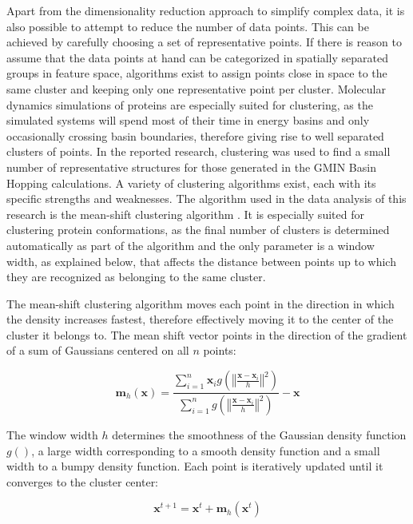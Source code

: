 \documentclass[english, a4paper, 12pt, titlepage, draft]{article}
\newcommand{\vect}[1]{\mathbf{#1}}
\newcommand{\norm}[1]{\left\Vert#1\right\Vert}
\newcommand{\fun}[2]{#1\left(#2\right)}
\begin{document}
Apart from the dimensionality reduction approach to simplify complex data, it is also possible to attempt to reduce the number of data points.
This can be achieved by carefully choosing a set of representative points.
If there is reason to assume that the data points at hand can be categorized in spatially separated groups in feature space, algorithms exist to assign points close in space to the same cluster and keeping only one representative point per cluster.
Molecular dynamics simulations of proteins are especially suited for clustering, as the simulated systems will spend most of their time in energy basins and only occasionally crossing basin boundaries, therefore giving rise to well separated clusters of points.
In the reported research, clustering was used to find a small number of representative structures for those generated in the GMIN Basin Hopping calculations.
A variety of clustering algorithms exist, each with its specific strengths and weaknesses.
The algorithm used in the data analysis of this research is the mean-shift clustering algorithm \cite{meanShift}.
It is especially suited for clustering protein conformations, as the final number of clusters is determined automatically as part of the algorithm and the only parameter is a window width, as explained below, that affects the distance between points up to which they are recognized as belonging to the same cluster.

The mean-shift clustering algorithm moves each point in the direction in which the density increases fastest, therefore effectively moving it to the center of the cluster it belongs to.
The mean shift vector points in the direction of the gradient of a sum of Gaussians centered on all $n$ points:

\newcommand{\g}{\fun{g}{\norm{\frac{\vect{x} - \vect{x}_i}{h}}^2}}
\newcommand{\sumi}{\sum_{i=1}^{n}}

\begin{equation}
    \vect{m}_h(\vect{x}) = \frac{\sumi \vect{x}_i \g}{\sumi \g} - \vect{x}
\end{equation}

The window width $h$ determines the smoothness of the Gaussian density function $g()$, a large width corresponding to a smooth density function and a small width to a bumpy density function.
Each point is iteratively updated until it converges to the cluster center:

\begin{equation}
    \vect{x}^{t+1} = \vect{x}^t + \vect{m}_h(\vect{x}^t)
\end{equation}
\end{document}

